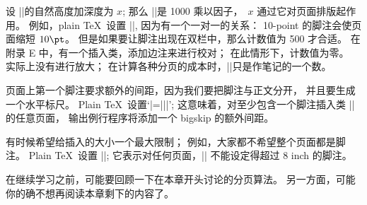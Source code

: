 \ddanger \1设 |\insert|\n 的自然高度加深度为 $x$;
那么 |\count|\n 是 1000 乘以因子，~$x$ 通过它对页面排版起作用。%
例如，plain \TeX\ 设置 |\count{}|,
因为有一个一对一的关系：
10-point 的脚注会使页面缩短 $10\pt$。%
但是如果要让脚注出现在双栏中，那么计数值为 500 才合适。%
在附录 E 中，有一个插入类，添加边注来进行校对；
在此情形下，计数值为零。%
实际上没有进行放大；
在计算各种分页的成本时，|\count|\n 只是作笔记的一个数。

\ddanger 页面上第一个脚注要求额外的间距，因为我们要把脚注与正文分开，
并且要生成一个水平标\hbox{尺。}%
Plain \TeX\ 设置`|\skip\footins=||\bigskipamount|';
这意味着，对至少包含一个脚注插入类 |\footins| 的任意页面，
输出例行程序将添加一个 bigskip 的额外间距。

\ddanger 有时候希望给插入的大小一个最大限制；
例如，大家都不希望整个页面都是脚注。%
Plain \TeX\ 设置 |\dimen\footins=8in|;
它表示对任何页面，|\box\footins| 不能设定得超过 8 inch 的脚注。

\ddanger 在继续学习之前，可能要回顾一下在本章开头讨论的分页算法。%
另一方面，可能你的确不想再阅读本章剩下的内容了。

